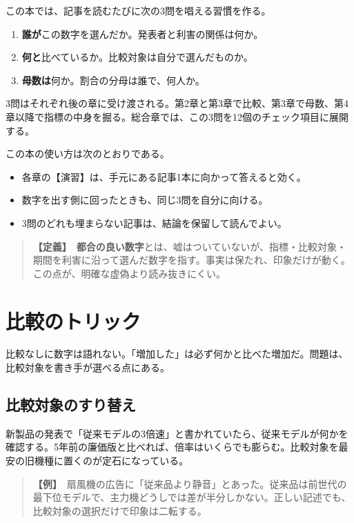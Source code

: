 \documentclass{article}
\begin{document}
この本では、記事を読むたびに次の3問を唱える習慣を作る。

\begin{enumerate}
\item \textbf{誰が}この数字を選んだか。発表者と利害の関係は何か。
\item \textbf{何と}比べているか。比較対象は自分で選んだものか。
\item \textbf{母数は}何か。割合の分母は誰で、何人か。
\end{enumerate}

3問はそれぞれ後の章に受け渡される。第2章と第3章で比較、第3章で母数、第4章以降で指標の中身を掘る。総合章では、この3問を12個のチェック項目に展開する。

この本の使い方は次のとおりである。

\begin{itemize}
\item 各章の【演習】は、手元にある記事1本に向かって答えると効く。
\item 数字を出す側に回ったときも、同じ3問を自分に向ける。
\item 3問のどれも埋まらない記事は、結論を保留して読んでよい。
\end{itemize}

\begin{quote}
\textbf{【定義】}\ \textbf{都合の良い数字}とは、嘘はついていないが、指標・比較対象・期間を利害に沿って選んだ数字を指す。事実は保たれ、印象だけが動く。この点が、明確な虚偽より読み抜きにくい。
\end{quote}

\section{比較のトリック}

比較なしに数字は語れない。「増加した」は必ず何かと比べた増加だ。問題は、比較対象を書き手が選べる点にある。

\subsection{比較対象のすり替え}

新製品の発表で「従来モデルの3倍速」と書かれていたら、従来モデルが何かを確認する。5年前の廉価版と比べれば、倍率はいくらでも膨らむ。比較対象を最安の旧機種に置くのが定石になっている。

\begin{quote}
\textbf{【例】}\ 扇風機の広告に「従来品より静音」とあった。従来品は前世代の最下位モデルで、主力機どうしでは差が半分しかない。正しい記述でも、比較対象の選択だけで印象は二転する。
\end{quote}
\end{document}
